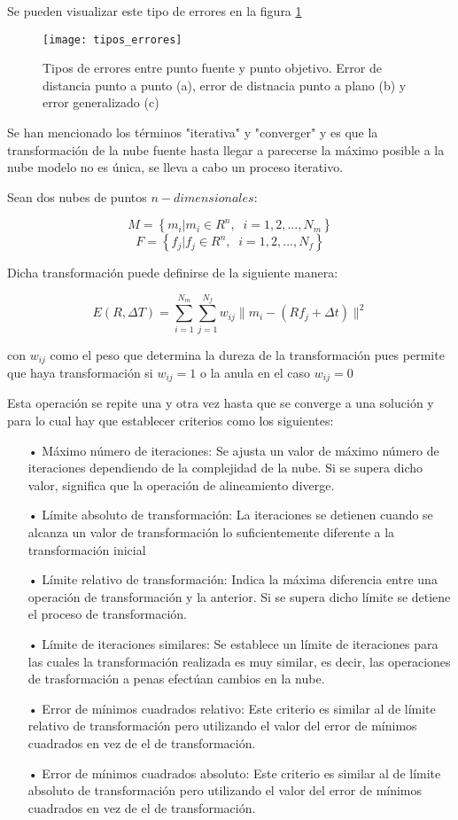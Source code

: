 Se pueden visualizar este tipo de errores en la figura \ref{fig:tipos_errores} 

\begin{figure}
\centering
\texttt{[image: tipos\_errores]}
\caption{Tipos de errores entre punto fuente y punto objetivo. Error de distancia punto a punto (a), error de distnacia punto a plano (b) y error generalizado (c)}\label{fig:tipos_errores}
\end{figure}

Se han mencionado los términos "iterativa" y "converger" y es que la transformación de la nube fuente hasta llegar a parecerse la máximo posible a la nube modelo no es única, se lleva a cabo un proceso iterativo. 


Sean dos nubes de puntos $n-dimensionales$:

$$M=\left\lbrace m_{i} | m_{i} \in R^n,\;\;i=1,2,...,N_{m} \right\rbrace$$
$$F=\left\lbrace f_{j} | f_{j} \in R^n,\;\;i=1,2,...,N_{f} \right\rbrace$$

Dicha transformación puede definirse de la siguiente manera:

$$E(R,\Delta T)=\sum_{i=1}^{N_m} \sum_{j=1}^{N_f} w_{ij} \| m_{i}-(Rf_{j}+\Delta t)  \|^2$$


con $w_{ij}$ como el peso que determina la dureza de la transformación pues permite que haya transformación si $w_{ij}=1$ o la anula en el caso $w_{ij}=0$

Esta operación se repite una y otra vez hasta que se converge a una solución y para lo cual hay que establecer criterios como los siguientes:

\begin{itemize}
\item[•]Máximo número de iteraciones:
Se ajusta un valor de máximo número de iteraciones dependiendo de la complejidad de la nube. Si se supera dicho valor, significa que la operación de alineamiento diverge.
\item[•]Límite absoluto de transformación: 
La iteraciones se detienen cuando se alcanza un valor de transformación lo suficientemente diferente a la transformación inicial
\item[•]Límite relativo de transformación:
Indica la máxima diferencia entre una operación de transformación y la anterior. Si se supera dicho límite se detiene el proceso de transformación.
\item[•]Límite de iteraciones similares: 
Se establece un límite de iteraciones para las cuales la transformación realizada es muy similar, es decir, las operaciones de trasformación a penas efectúan cambios en la nube.
\item[•]Error de mínimos cuadrados relativo:
Este criterio es similar al de límite relativo de transformación pero utilizando el valor del error de mínimos cuadrados en vez de el de transformación.
\item[•]Error de mínimos cuadrados absoluto:
Este criterio es similar al de límite absoluto de transformación pero utilizando el valor del error de mínimos cuadrados en vez de el de transformación.
\end{itemize}

